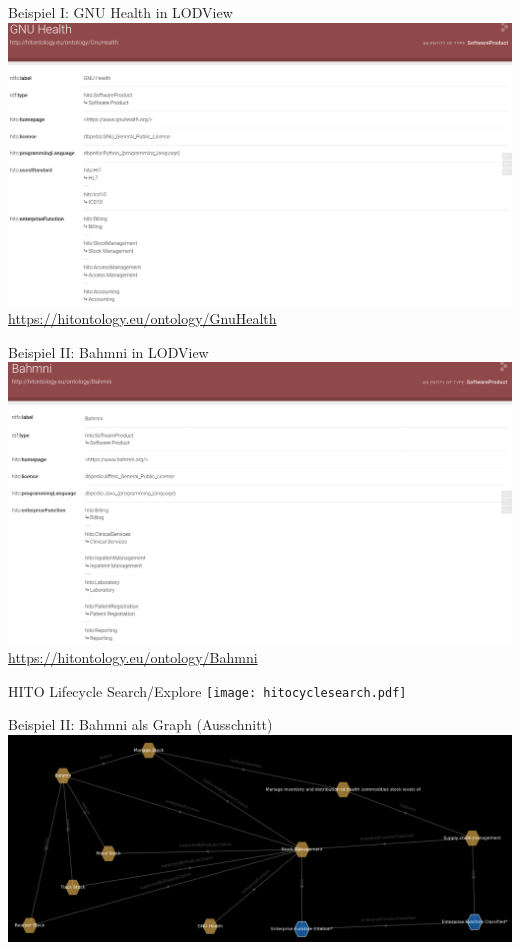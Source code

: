 \documentclass[aspectratio=1610,12pt]{beamer}
\begin{document}
\begin{frame}{Beispiel I: GNU Health in LODView}
\vspace{-0.3cm}
\centering
\includegraphics[width=.95\textwidth]{img/GnuHealth.png}
\footnotesize{\url{https://hitontology.eu/ontology/GnuHealth}}
\end{frame}

\begin{frame}{Beispiel II: Bahmni in LODView}
\vspace{-0.3cm}
\centering
\includegraphics[width=.95\textwidth]{img/bahmni.png}
\footnotesize{\url{https://hitontology.eu/ontology/Bahmni}}
\end{frame}
\begin{frame}{HITO Lifecycle Search/Explore}
  \centering
  \vspace{-0.5cm}
  \texttt{[image: hitocyclesearch.pdf]}
\end{frame}

\begin{frame}{Beispiel II: Bahmni als Graph (Ausschnitt)}
  \includegraphics[width=\textwidth, height=.65\textheight]{img/bahmni_star.png}
\end{frame}
\end{document}
